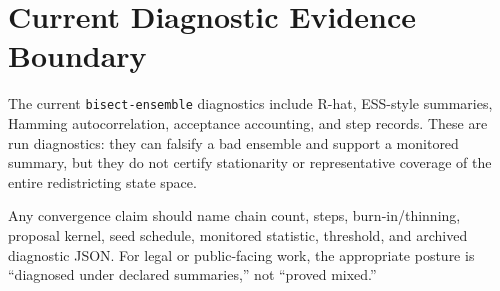 \section{Current Diagnostic Evidence Boundary}

The current \texttt{bisect-ensemble} diagnostics include R-hat, ESS-style
summaries, Hamming autocorrelation, acceptance accounting, and step records.
These are run diagnostics: they can falsify a bad ensemble and support a
monitored summary, but they do not certify stationarity or representative
coverage of the entire redistricting state space.

Any convergence claim should name chain count, steps, burn-in/thinning, proposal
kernel, seed schedule, monitored statistic, threshold, and archived diagnostic
JSON.  For legal or public-facing work, the appropriate posture is ``diagnosed
under declared summaries,'' not ``proved mixed.''
